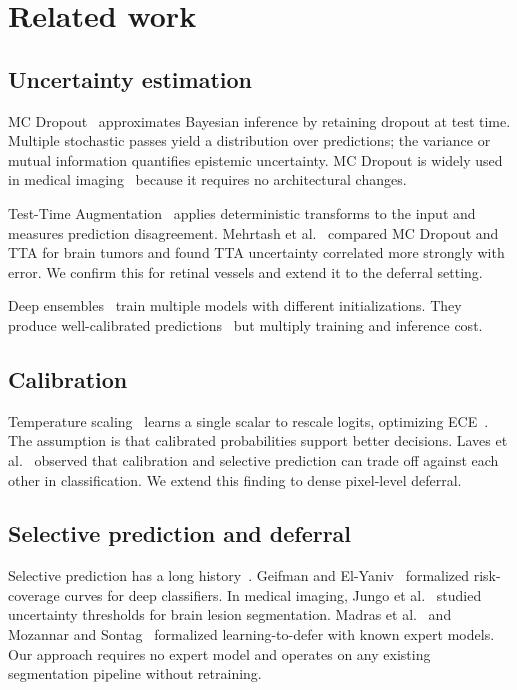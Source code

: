 \documentclass[journal]{IEEEtran}
\begin{document}
\section{Related work}

\subsection{Uncertainty estimation}

MC Dropout~\cite{gal2016dropout} approximates Bayesian inference by retaining
dropout at test time. Multiple stochastic passes yield a distribution over
predictions; the variance or mutual information quantifies epistemic
uncertainty. MC Dropout is widely used in medical
imaging~\cite{nair2020exploring,jungo2018effect,roy2019bayesian} because it
requires no architectural changes.

Test-Time Augmentation~\cite{wang2019aleatoric,ayhan2018test} applies
deterministic transforms to the input and measures prediction disagreement.
Mehrtash et al.~\cite{mehrtash2020confidence} compared MC Dropout and TTA for
brain tumors and found TTA uncertainty correlated more strongly with error. We
confirm this for retinal vessels and extend it to the deferral setting.

Deep ensembles~\cite{lakshminarayanan2017simple} train multiple models with
different initializations. They produce well-calibrated
predictions~\cite{ovadia2019can} but multiply training and inference cost.

\subsection{Calibration}

Temperature scaling~\cite{guo2017calibration} learns a single scalar to rescale
logits, optimizing ECE~\cite{naeini2015obtaining}. The assumption is that
calibrated probabilities support better decisions. Laves et
al.~\cite{laves2020well} observed that calibration and selective prediction can
trade off against each other in classification. We extend this finding to dense
pixel-level deferral.

\subsection{Selective prediction and deferral}

Selective prediction has a long history~\cite{chow1970optimum,el2010foundations}.
Geifman and El-Yaniv~\cite{geifman2017selective} formalized risk-coverage
curves for deep classifiers. In medical imaging, Jungo et
al.~\cite{jungo2020analyzing} studied uncertainty thresholds for brain lesion
segmentation. Madras et al.~\cite{madras2018predict} and Mozannar and
Sontag~\cite{mozannar2020consistent} formalized learning-to-defer with known
expert models. Our approach requires no expert model and operates on any
existing segmentation pipeline without retraining.
\end{document}
